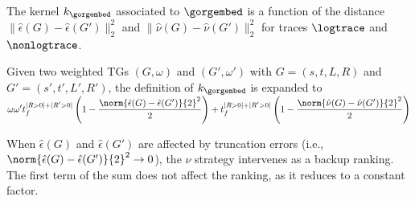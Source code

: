 The kernel $k_{\gorgembed}$ associated to $\gorgembed$ is {a function of the distance  $\|\hat{\epsilon}(G)-\hat{\epsilon}(G')\|_2^2$ and $\|\hat{\nu}(G)-\hat{\nu}(G')\|_2^2$ for traces $\logtrace$ and ${\nonlogtrace}$.}
%

\begin{proposition}
	\label{lem:rewritinglemma}
	Given {two weighted TGs} $(G,\omega)$ and $(G',\omega')$ with $G=(s,t,L,R)$ and $G'=(s',t',L',R')$, the definition of
	$k_\gorgembed$ is expanded to
	$\begin{aligned}
	\omega\omega't_f^{|R>0|+|R'>0|}\left(1-\frac{\norm{\hat{\epsilon}(G)-\hat{\epsilon}(G')}{2}^2}{2}\right)+t_f^{|R>0|+|R'>0|}\left(1-\frac{\norm{\hat{\nu}(G)-\hat{\nu}(G')}{2}^2}{2}\right)
	\end{aligned}$
\end{proposition}

When $\hat{\epsilon}(G)$ and $\hat{\epsilon}(G')$ are affected by truncation errors 
(i.e., $\norm{\hat{\epsilon}(G)-\hat{\epsilon}(G')}{2}^2\to 0$), the $\nu$ strategy intervenes as a backup ranking. The first 
term of the sum does not affect the ranking, as it reduces to a constant factor.

%





